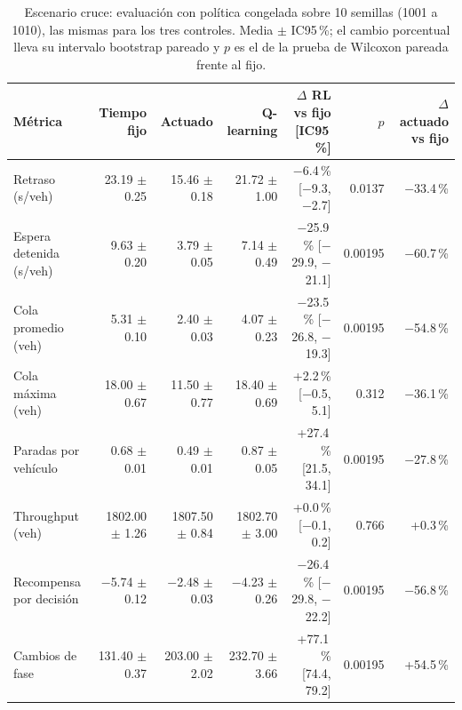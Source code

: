 \begin{table}[H]
\centering
\scriptsize
\setlength{\tabcolsep}{3pt}
\setlength{\tabcolsep}{2pt}
\begin{tabular}{lrrrrrr}
\toprule
Métrica & Tiempo fijo & Actuado & Q-learning & \makecell{$\Delta$ RL vs fijo\\{}[IC95\,\%]} & $p$ & \makecell{$\Delta$ actuado\\vs fijo} \\
\midrule
Retraso (s/veh) & 23.19 $\pm$ 0.25 & 15.46 $\pm$ 0.18 & 21.72 $\pm$ 1.00 & \makecell{$-$6.4\,\%\\{}[$-$9.3, $-$2.7]} & 0.0137 & $-$33.4\,\% \\
Espera detenida (s/veh) & 9.63 $\pm$ 0.20 & 3.79 $\pm$ 0.05 & 7.14 $\pm$ 0.49 & \makecell{$-$25.9\,\%\\{}[$-$29.9, $-$21.1]} & 0.00195 & $-$60.7\,\% \\
Cola promedio (veh) & 5.31 $\pm$ 0.10 & 2.40 $\pm$ 0.03 & 4.07 $\pm$ 0.23 & \makecell{$-$23.5\,\%\\{}[$-$26.8, $-$19.3]} & 0.00195 & $-$54.8\,\% \\
Cola máxima (veh) & 18.00 $\pm$ 0.67 & 11.50 $\pm$ 0.77 & 18.40 $\pm$ 0.69 & \makecell{+2.2\,\%\\{}[$-$0.5, 5.1]} & 0.312 & $-$36.1\,\% \\
Paradas por vehículo & 0.68 $\pm$ 0.01 & 0.49 $\pm$ 0.01 & 0.87 $\pm$ 0.05 & \makecell{+27.4\,\%\\{}[21.5, 34.1]} & 0.00195 & $-$27.8\,\% \\
Throughput (veh) & 1802.00 $\pm$ 1.26 & 1807.50 $\pm$ 0.84 & 1802.70 $\pm$ 3.00 & \makecell{+0.0\,\%\\{}[$-$0.1, 0.2]} & 0.766 & +0.3\,\% \\
Recompensa por decisión & $-$5.74 $\pm$ 0.12 & $-$2.48 $\pm$ 0.03 & $-$4.23 $\pm$ 0.26 & \makecell{$-$26.4\,\%\\{}[$-$29.8, $-$22.2]} & 0.00195 & $-$56.8\,\% \\
Cambios de fase & 131.40 $\pm$ 0.37 & 203.00 $\pm$ 2.02 & 232.70 $\pm$ 3.66 & \makecell{+77.1\,\%\\{}[74.4, 79.2]} & 0.00195 & +54.5\,\% \\
\bottomrule
\end{tabular}
\caption[Escenario cruce: evaluación con política congelada]{Escenario cruce: evaluación con política congelada sobre 10 semillas (1001 a 1010), las mismas para los tres controles. Media $\pm$ IC95\,\%; el cambio porcentual lleva su intervalo bootstrap pareado y $p$ es el de la prueba de Wilcoxon pareada frente al fijo.}
\label{tab:cruce-evaluacion}
\end{table}
